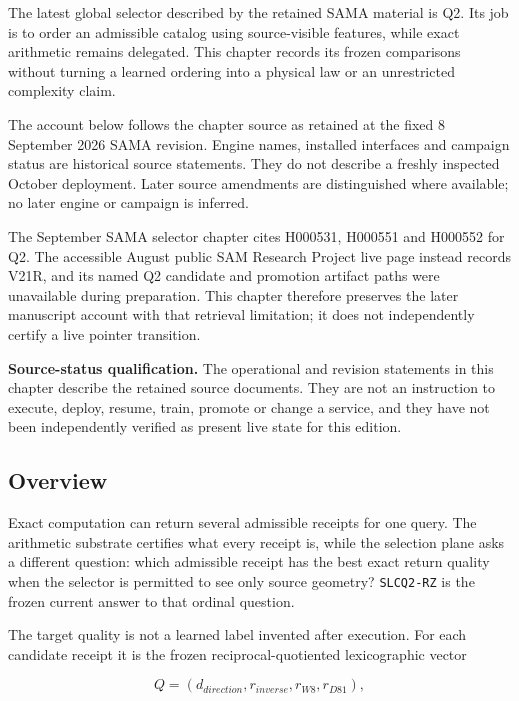 \label{viii-ch07-ordinal-selection-and-the-delegated-exact-engine}

The latest global selector described by the retained SAMA material is
Q2. Its job is to order an admissible catalog using source-visible
features, while exact arithmetic remains delegated. This chapter records
its frozen comparisons without turning a learned ordering into a
physical law or an unrestricted complexity claim.

The account below follows the chapter source as retained at the fixed 8
September 2026 SAMA revision. Engine names, installed interfaces and
campaign status are historical source statements. They do not describe a
freshly inspected October deployment. Later source amendments are
distinguished where available; no later engine or campaign is inferred.

The September SAMA selector chapter cites H000531, H000551 and H000552
for Q2. The accessible August public SAM Research Project live page
instead records V21R, and its named Q2 candidate and promotion artifact
paths were unavailable during preparation. This chapter therefore
preserves the later manuscript account with that retrieval limitation;
it does not independently certify a live pointer transition.

\textbf{Source-status qualification.} The operational and revision
statements in this chapter describe the retained source documents. They
are not an instruction to execute, deploy, resume, train, promote or
change a service, and they have not been independently verified as
present live state for this edition.

\subsection{Overview}\label{viii-ch07-overview}

Exact computation can return several admissible receipts for one query.
The arithmetic substrate certifies what every receipt is, while the
selection plane asks a different question: which admissible receipt has
the best exact return quality when the selector is permitted to see only
source geometry? \texttt{SLCQ2-RZ} is the frozen current answer to that
ordinal question.

The target quality is not a learned label invented after execution. For
each candidate receipt it is the frozen reciprocal-quotiented
lexicographic vector

\[
Q=(d_{direction},r_{inverse},r_{W8},r_{D81}),
\]

